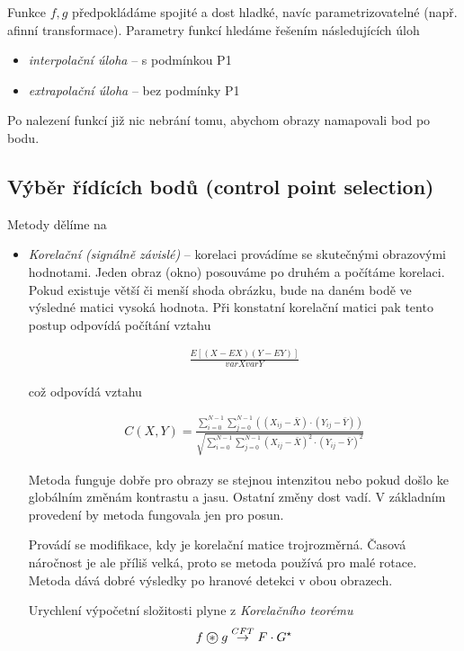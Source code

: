 Funkce $f,g$ předpokládáme spojité a dost hladké, navíc parametrizovatelné (např. afinní transformace). 
Parametry funkcí hledáme řešením následujících úloh
\begin{itemize}
\item {\em interpolační úloha} -- s podmínkou P1
\item {\em extrapolační úloha} -- bez podmínky P1
\end{itemize}

Po nalezení funkcí již nic nebrání tomu, abychom obrazy namapovali bod po bodu.

\subsection{Výběr řídících bodů (control point selection)}
Metody dělíme na
\begin{itemize}
\item {\em Korelační (signálně závislé)} -- korelaci provádíme se skutečnými obrazovými hodnotami. Jeden obraz (okno)
posouváme po druhém a počítáme korelaci. Pokud existuje větší či menší shoda obrázku, bude na daném bodě ve výsledné matici
vysoká hodnota. Při konstatní korelační matici pak tento postup odpovídá počítání vztahu

\begin{eqnarray}
\frac{E[(X-EX)(Y-EY)]}{varX varY}
\end{eqnarray}

což odpovídá vztahu

\begin{eqnarray}
C(X,Y)=\frac{\sum\limits_{i=0}^{N-1}
\sum\limits_{j=0}^{N-1}((X_{ij}-\bar{X})\cdot(Y_{ij}-\bar{Y}))}
{\sqrt{\sum\limits_{i=0}^{N-1}\sum\limits_{j=0}^{N-1}(X_{ij}-\bar{X})^2\cdot(Y_{ij}-\bar{Y})^2}}
\end{eqnarray}

Metoda funguje dobře pro obrazy se stejnou intenzitou nebo pokud došlo ke globálním změnám kontrastu a jasu. Ostatní změny
dost vadí. V základním provedení by metoda fungovala jen pro posun. 

Provádí se modifikace, kdy je korelační matice trojrozměrná. Časová náročnost je ale příliš velká, proto se metoda používá
pro malé rotace. Metoda dává dobré výsledky po hranové detekci v obou obrazech.

Urychlení výpočetní složitosti plyne z {\em Korelačního teorému}
\begin{eqnarray}
f\corr g \stackrel{CFT}{\rightarrow}F\cdot G^\star
\end{eqnarray}


\end{itemize}
